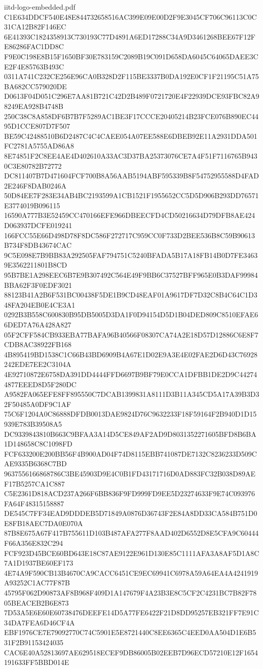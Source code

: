 \begin{filecontents*}[overwrite]{iitd-logo-embedded.pdf}
C1E634DDCF540E48E844732658516AC399E09E00D2F9E3045CF706C96113C0C31CA12B82F146EC
6E41393C1824358913C730193C77D4891A6ED17288C34A9D3461268BEE67F12FE86286FAC1DD8C
F9E0C198E8B15F1650BF30E783159C2089B19C091D658DA6045C64065DAEE3CE2F4E85763B493C
0311A741C232CE256E96CA0B328D2F115BE3337B0DA192E0CF1F21195C51A75BA682CC579020DE
D0613F04D051C296E7AA81B721C42D2B489F0721720E4F22939DCE93FBC82A98249EA928B4748B
250C38C8A858DF6B7B7F5289AC1BE3F17CCCE20405214B23FCE076B890EC4495D1CCE807D7F507
BE59C42488510B6D2487C4C4CAEE054A07EE588E6DBEB92E11A2931DDA501FC2781A5755AD86A8
8E74851F2C8EE4AE4D402610A33AC3D37BA25373076CE7A4F51F7116765B9430C3E80782B72772
DC811407B7D471604FCF700B8A56AAB5194ABF595339B8F54752955588D4FAD2E246F8DAB0246A
50D84EE7F283E34AB4BC2193599A1CB1521F1955652CC5D5D906B293DD76571E3774019B096115
16590A777B3E52459CC470166EFE966DBEECFD4CD50216634D79DFB8AE424D063937DCFE019241
166FCC55E66D498D78F8DC586F272717C959CC0F733D2BEE536B8C59B90613B734F8DB43674CAC
9C5E098E7B9BB83A292505FAF794751C5240BFADA5B17A18FB14B0D7FE34639E3562211801B8CD
95B7BE1A298EEC6B7E9B307492C564E49F9BB6C37527BFF965E0B3DAF99984BBA62F3F0EDF3021
88123B41A2B6F531BC00438F5DE1B9CD48EAF01A9617DF7D32C8B4C64C1D348FA204EB0E4CE3A1
0292B3B558C600830B95DB5005D3DA1F0D94154D5D1B04DED809C8510EFAE66DED7A76A428A827
05F2CFF584CB933EBA77BAFA96B40566F08307CA74A2E18D57D12886C6E8F7CDB8AC38922FB168
4B895419BD1538C1C66B43BD6909B4A67E1D02E9A3E4E02FAE2D6D43C76928242EDE7EE2C3104A
4E92710872E6758DA391DD4444FFD6697B9BF79E0CCA1DFBB1DE2D9C442744877EEED8D5F280DC
A9582FA065EFE8FF895550C7DCAB1399831A8111D3B11A345CD5A17A39B3D32F50485A0DF9C1AF
75C6F1204A0C86888DFDB0013DAE9824D76C9632233F18F59164F2B940D1D15939E783B39508A5
DC9339843810B663C9BFAA3A14D5CE849AF2AD9D8031352271605BFD8B6BA1D148658C8C1098FD
FCF633200E200BB56F4B900AD04F74D8115EBB741087DE7132C8236233D509CAE9335B6368C7BD
9637556166868786C3BE45903D9E4C0B1FD43171716D0AD883FC32B038D89AEF17B5257CA1C887
C5E2361D818ACD237A266F6BB836F9FD999FD9EE5D23274633F9E74C093976FA64F48315158887
DE545C7FF34EAD9DDDEB5D71849A0876D36743F2E84A8DD33CA584B751D0E8FB18AEC7DA0E070A
87B8E675A67F417B755611D103B487AFA277F8AAD402D6552D8E5CFA9C60444F66A356E832C294
FCF923D45BCE60BD643E18C87AE9122E961D130E85C1111AFA3A8AF5D1A8C7A1D1937BE60EF173
4E74A9F590CB13B4670CA9CACC6451CE9EC69941C6978A59A64EA4A4241919A93252C1AC77F87B
45795F062D90873AF8B968F409D1A147679F4A23B3E8C5CF2C4231BC7B82F7805BEACEB2B6E873
7D53A5E6E60E60738476DEEFE14D5A77FE6422F21D8DD95257EB321FF7E91C34DA7FEA6D46CF4A
EBF1976CE7E79092770C74C5901E5E8721440C8EE6365C4EED0AA504D1E6B531F2B91153424035
CAC6E40A52813697AE629518ECEF9DB86005B02EEB7D96ECD57210E12F1654191633FF5BBD014E

\end{filecontents*}
